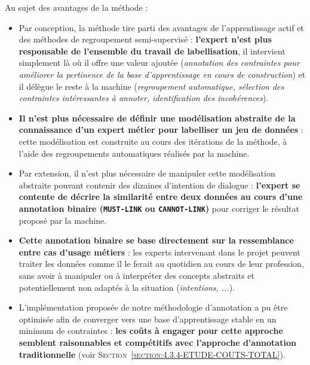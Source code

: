 		Au sujet des avantages de la méthode :
		\begin{itemize}
			\item[\textcolor{colorDarkPastelGreen}{\textcolor{colorDarkPastelGreen}{\faThumbsUp}}]
				Par conception, la méthode tire parti des avantages de l'apprentissage actif et des méthodes de regroupement semi-supervisé : \textbf{l'expert n'est plus responsable de l'ensemble du travail de labellisation}, il intervient simplement là où il offre une valeur ajoutée (\textit{annotation des contraintes pour améliorer la pertinence de la base d'apprentissage en cours de construction}) et il délègue le reste à la machine (\textit{regroupement automatique, sélection des contraintes intéressantes à annoter, identification des incohérences}).
			\item[\textcolor{colorDarkPastelGreen}{\textcolor{colorDarkPastelGreen}{\faThumbsUp}}]
				\textbf{Il n'est plus nécessaire de définir une modélisation abstraite de la connaissance d'un expert métier pour labelliser un jeu de données} : cette modélisation est construite au cours des itérations de la méthode, à l'aide des regroupements automatiques réalisés par la machine.
			\item[\textcolor{colorDarkPastelGreen}{\textcolor{colorDarkPastelGreen}{\faThumbsUp}}]
				Par extension, il n'est plus nécessaire de manipuler cette modélisation abstraite pouvant contenir des dizaines d'intention de dialogue :
				\textbf{l'expert se contente de décrire la similarité entre deux données au cours d'une annotation binaire (\texttt{MUST-LINK} ou \texttt{CANNOT-LINK})} pour corriger le résultat proposé par la machine.
			\item[\textcolor{colorDarkPastelGreen}{\textcolor{colorDarkPastelGreen}{\faThumbsUp}}]
				\textbf{Cette annotation binaire se base directement sur la ressemblance entre cas d'usage métiers} : les experts intervenant dans le projet peuvent traiter les données comme il le ferait au quotidien au cours de leur profession, sans avoir à manipuler ou à interpréter des concepts abstraits et potentiellement non adaptés à la situation (\textit{intentions, ...}).
			\item[\textcolor{colorDarkPastelGreen}{\textcolor{colorDarkPastelGreen}{\faThumbsUp}}]
				L'implémentation proposée de notre méthodologie d'annotation a pu être optimisée afin de converger vers une base d'apprentissage stable en un minimum de contraintes : \textbf{les coûts à engager pour cette approche semblent raisonnables et compétitifs avec l'approche d'annotation traditionnelle} (voir \textsc{Section~\ref{section:4.3.4-ETUDE-COUTS-TOTAL}}).
		\end{itemize}
	
